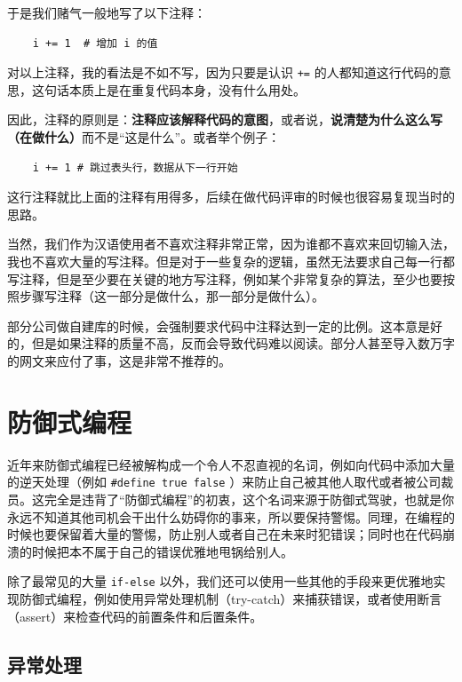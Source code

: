 于是我们赌气一般地写了以下注释：
\begin{verbatim}
    i += 1  # 增加 i 的值
\end{verbatim}

对以上注释，我的看法是不如不写，因为只要是认识  \texttt{+=} 的人都知道这行代码的意思，这句话本质上是在重复代码本身，没有什么用处。

因此，注释的原则是：\textbf{注释应该解释代码的意图}，或者说，\textbf{说清楚为什么这么写（在做什么）}而不是“这是什么”。或者举个例子：

\begin{verbatim}
    i += 1 # 跳过表头行，数据从下一行开始
\end{verbatim}

这行注释就比上面的注释有用得多，后续在做代码评审的时候也很容易复现当时的思路。

当然，我们作为汉语使用者不喜欢注释非常正常，因为谁都不喜欢来回切输入法，我也不喜欢大量的写注释。但是对于一些复杂的逻辑，虽然无法要求自己每一行都写注释，但是至少要在关键的地方写注释，例如某个非常复杂的算法，至少也要按照步骤写注释（这一部分是做什么，那一部分是做什么）。

\begin{note}
  部分公司做自建库的时候，会强制要求代码中注释达到一定的比例。这本意是好的，但是如果注释的质量不高，反而会导致代码难以阅读。部分人甚至导入数万字的网文来应付了事，这是非常不推荐的。
\end{note}

\section{防御式编程}

近年来防御式编程已经被解构成一个令人不忍直视的名词，例如向代码中添加大量的逆天处理（例如 \texttt{\#define true false} ）来防止自己被其他人取代或者被公司裁员。这完全是违背了“防御式编程”的初衷，这个名词来源于防御式驾驶，也就是你永远不知道其他司机会干出什么妨碍你的事来，所以要保持警惕。同理，在编程的时候也要保留着大量的警惕，防止别人或者自己在未来时犯错误；同时也在代码崩溃的时候把本不属于自己的错误优雅地甩锅给别人。

除了最常见的大量 \texttt{if-else} 以外，我们还可以使用一些其他的手段来更优雅地实现防御式编程，例如使用异常处理机制（try-catch）来捕获错误，或者使用断言（assert）来检查代码的前置条件和后置条件。

\subsection{异常处理}

